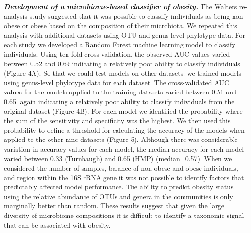\documentclass[12pt,]{article}
\begin{document}
\textbf{\emph{Development of a microbiome-based classifier of obesity.}}
The Walters re-analysis study suggested that it was possible to classify
individuals as being non-obese or obese based on the composition of
their microbiota. We repeated this analysis with additional datasets
using OTU and genus-level phylotype data. For each study we developed a
Random Forest machine learning model to classify individuals. Using
ten-fold cross validation, the observed AUC values varied between 0.52
and 0.69 indicating a relatively poor ability to classify individuals
(Figure 4A). So that we could test models on other datasets, we trained
models using genus-level phylotype data for each dataset. The
cross-validated AUC values for the models applied to the training
datasets varied between 0.51 and 0.65, again indicating a relatively
poor ability to classify individuals from the original dataset (Figure
4B). For each model we identified the probability where the sum of the
sensitivity and specificity was the highest. We then used this
probability to define a threshold for calculating the accuracy of the
models when applied to the other nine datasets (Figure 5). Although
there was considerable variation in accuracy values for each model, the
median accuracy for each model varied between 0.33 (Turnbaugh) and 0.65
(HMP) (median=0.57). When we considered the number of samples, balance
of non-obese and obese individuals, and region within the 16S rRNA gene
it was not possible to identify factors that predictably affected model
performance. The ability to predict obesity status using the relative
abundance of OTUs and genera in the communities is only marginally
better than random. These results suggest that given the large diversity
of microbiome compositions it is difficult to identify a taxonomic
signal that can be associated with obesity.
\end{document}
